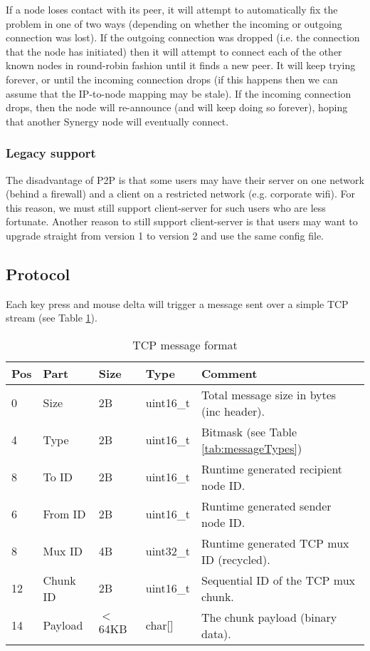 If a node loses contact with its peer, it will attempt to automatically fix
the problem in one of two ways (depending on whether the incoming or outgoing 
connection was lost). If the outgoing connection was dropped (i.e. the 
connection that the node has initiated) then it will attempt to connect each 
of the other known nodes in round-robin fashion until it finds a new peer. It 
will keep trying forever, or until the incoming connection drops (if this 
happens then we can assume that the IP-to-node mapping may be stale). If
the incoming connection drops, then the node will re-announce (and will keep
doing so forever), hoping that another Synergy node will eventually connect.

\subsubsection{Legacy support}

The disadvantage of P2P is that some users may have their server on one network
(behind a firewall) and a client on a restricted network (e.g. corporate wifi).
For this reason, we must still support client-server for such users who are 
less fortunate. Another reason to still support client-server is that users may
want to upgrade straight from version 1 to version 2 and use the same config 
file.

\subsection{Protocol}

Each key press and mouse delta will trigger a message sent over a simple TCP 
stream (see Table \ref{tab:messageFormat}).

\begin{table}[ht!]
  \begin{tabular}{|l|l|l|l|l|}
    \hline
    \textbf{Pos} &
    \textbf{Part} &
    \textbf{Size} &
    \textbf{Type} &
    \textbf{Comment} \\
    \hline
    0 & Size & 2B & uint16\_t & Total message size in bytes (inc header). \\
    4 & Type & 2B & uint16\_t & Bitmask (see Table \ref{tab:messageTypes}) \\
    8 & To ID & 2B & uint16\_t & Runtime generated recipient node ID. \\
    6 & From ID & 2B & uint16\_t & Runtime generated sender node ID. \\
    8 & Mux ID & 4B & uint32\_t & Runtime generated TCP mux ID (recycled). \\
    12 & Chunk ID & 2B & uint16\_t & Sequential ID of the TCP mux chunk. \\
    14 & Payload & $<$64KB & char[] & The chunk payload (binary data). \\
    \hline
  \end{tabular}
  \caption{TCP message format}
  \label{tab:messageFormat}
\end{table}

